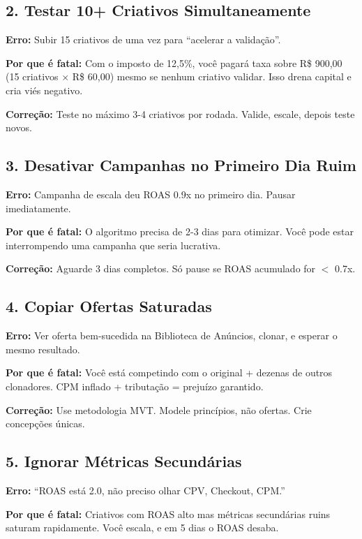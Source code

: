 \documentclass[12pt, a4paper]{article}
\newcommand{\reais}[1]{R\$ #1}
\begin{document}
\subsection{2. Testar 10+ Criativos Simultaneamente}

\textbf{Erro:} Subir 15 criativos de uma vez para ``acelerar a validação''.

\textbf{Por que é fatal:} Com o imposto de 12,5\%, você pagará taxa sobre \reais{900,00} (15 criativos $\times$ \reais{60,00}) mesmo se nenhum criativo validar. Isso drena capital e cria viés negativo.

\textbf{Correção:} Teste no máximo 3-4 criativos por rodada. Valide, escale, depois teste novos.

\pagebreak

\subsection{3. Desativar Campanhas no Primeiro Dia Ruim}

\textbf{Erro:} Campanha de escala deu ROAS 0.9x no primeiro dia. Pausar imediatamente.

\textbf{Por que é fatal:} O algoritmo precisa de 2-3 dias para otimizar. Você pode estar interrompendo uma campanha que seria lucrativa.

\textbf{Correção:} Aguarde 3 dias completos. Só pause se ROAS acumulado for $<$ 0.7x.

\subsection{4. Copiar Ofertas Saturadas}

\textbf{Erro:} Ver oferta bem-sucedida na Biblioteca de Anúncios, clonar, e esperar o mesmo resultado.

\textbf{Por que é fatal:} Você está competindo com o original + dezenas de outros clonadores. CPM inflado + tributação = prejuízo garantido.

\textbf{Correção:} Use metodologia MVT. Modele princípios, não ofertas. Crie concepções únicas.

\subsection{5. Ignorar Métricas Secundárias}

\textbf{Erro:} ``ROAS está 2.0, não preciso olhar CPV, Checkout, CPM.''

\textbf{Por que é fatal:} Criativos com ROAS alto mas métricas secundárias ruins saturam rapidamente. Você escala, e em 5 dias o ROAS desaba.
\end{document}
